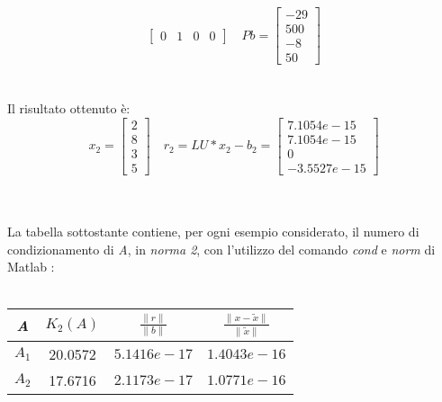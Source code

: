 \begin{description}
\[\begin{bmatrix}
		0 & 1 & 0 & 0 
	\end{bmatrix} \quad
	Pb =\begin{bmatrix}
		-29 \\
		500 \\
		-8 \\
		50               
	\end{bmatrix}
	\]\\\\
	Il risultato ottenuto è:\\
	\[
	x_2 =\begin{bmatrix}
		  2 \\
		  8 \\
		  3 \\
		  5 
	\end{bmatrix} \quad
	r_2 = LU*x_2-b_2 =\begin{bmatrix}
		  7.1054e-15 \\
		  7.1054e-15 \\
		  0 \\
		  -3.5527e-15 
	\end{bmatrix}
	\]\\\\
\end{description}
La tabella sottostante contiene, per ogni esempio considerato, il numero di condizionamento di \textit{A}, in \textit{norma 2}, con l'utilizzo del comando \textit{cond} e \textit{norm} di Matlab :\\\
\begin{center}
\begin{tabular}{ | c | c | c | c | }
	\hline
	\textit{A} & $K_2(A)$ & $\frac{\|r\|}{\|b\|}$ & $\frac{\|x-\tilde{x}\|}{\|\tilde{x}\|}$ \\
	\hline
	$A_1$ & 20.0572 & $5.1416e-17$ & $1.4043e-16$ \\
	$A_2$ &	17.6716 & $2.1173e-17$ & $1.0771e-16$ \\
	\hline
\end{tabular}
\end{center}